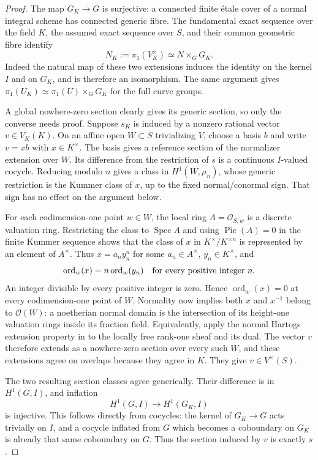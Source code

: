 \begin{proof}
The map $G_K\to G$ is surjective: a connected finite \'etale cover
of a normal integral scheme has connected generic fibre. The
fundamental exact sequence over the field $K$, the assumed exact
sequence over $S$, and their common geometric fibre identify
\[
 N_K:=\pi_1(V_K^\times)\simeq N\mathbin{\times}_G G_K.
                                                               \tag{RG.1}
\]
Indeed the natural map of these two extensions induces the identity
on the kernel $I$ and on $G_K$, and is therefore an isomorphism.
The same argument gives
$\pi_1(U_K)\simeq\pi_1(U)\times_GG_K$ for the full curve groups.

A global nowhere-zero section clearly gives its generic section,
so only the converse needs proof. Suppose $s_K$ is induced by a
nonzero rational vector $v\in V_K(K)$. On an affine open
$W\subset S$ trivializing $V$, choose a basis $b$ and write
$v=xb$ with $x\in K^\times$. The basis gives a reference section
of the normalizer extension over $W$. Its difference from the
restriction of $s$ is a continuous $I$-valued cocycle. Reducing
modulo $n$ gives a class in $H^1(W,\mu_n)$, whose generic restriction
is the Kummer class of $x$, up to the fixed normal/conormal sign.
That sign has no effect on the argument below.

For each codimension-one point $w\in W$, the local ring
$A=\mathcal O_{S,w}$ is a discrete valuation ring. Restricting the
class to $\operatorname{Spec}A$ and using $\operatorname{Pic}(A)=0$
in the finite Kummer sequence shows that the class of $x$ in
$K^\times/K^{\times n}$ is represented by an element of $A^\times$.
Thus $x=a_n y_n^n$ for some $a_n\in A^\times$, $y_n\in K^\times$,
and
\[
 \operatorname{ord}_w(x)=n\operatorname{ord}_w(y_n)
 \quad\hbox{for every positive integer }n.
\]
An integer divisible by every positive integer is zero. Hence
$\operatorname{ord}_w(x)=0$ at every codimension-one point of $W$.
Normality now implies both $x$ and $x^{-1}$ belong to
$\mathcal O(W)$: a noetherian normal domain is the intersection
of its height-one valuation rings inside its fraction field.
Equivalently, apply the normal Hartogs extension property in
\cite[Theorem~5.10.5 and proof, pp.~115--116]{EGAIV2} to the
locally free rank-one sheaf and its dual. The vector $v$ therefore
extends as a nowhere-zero section over every such $W$, and these
extensions agree on overlaps because they agree in $K$.
They give $v\in V^\times(S)$.

The two resulting section classes agree generically. Their
difference is in $H^1(G,I)$, and inflation
\[
 H^1(G,I)\longrightarrow H^1(G_K,I)
\]
is injective. This follows directly from cocycles: the kernel of
$G_K\to G$ acts trivially on $I$, and a cocycle inflated from $G$
which becomes a coboundary on $G_K$ is already that same
coboundary on $G$. Thus the section induced by $v$ is exactly $s$.


\end{proof}
